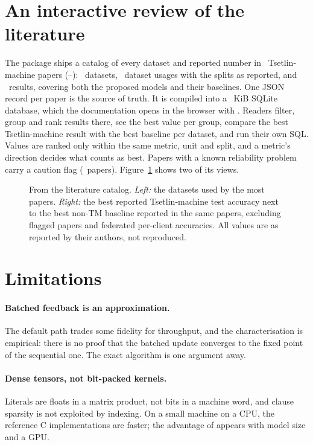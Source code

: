 \documentclass[10.5pt,a4paper]{article}
\begin{document}
\section{An interactive review of the literature}

The package ships a catalog of every dataset and reported number in \litNpapers\
Tsetlin-machine papers (\litYearMin--\litYearMax): \litNdatasets\ datasets, \litNusages\
dataset usages with the splits as reported, and \litNresults\ results, covering both the
proposed models and their baselines. One JSON record per paper is the source of truth. It is
compiled into a \litDbKiB~KiB SQLite database, which the documentation opens in the browser
with \code{sql.js}. Readers filter, group and rank results there, see the best value per
group, compare the best Tsetlin-machine result with the best baseline per dataset, and run
their own SQL. Values are ranked only within the same metric, unit and split, and a metric's
direction decides what counts as best. Papers with a known reliability problem carry a
caution flag (\litNflagged\ papers). Figure~\ref{fig:s-literature} shows two of its views.

\begin{figure}[htbp]
\centering
\resizebox{\linewidth}{!}{}
\caption{From the literature catalog. \emph{Left:} the datasets used by the most papers.
  \emph{Right:} the best reported Tsetlin-machine test accuracy next to the best non-TM
  baseline reported in the same papers, excluding flagged papers and federated per-client
  accuracies. All values are as reported by their authors, not reproduced.}
\label{fig:s-literature}
\end{figure}

\section{Limitations}

\paragraph{Batched feedback is an approximation.} The default path trades some fidelity for
throughput, and the characterisation is empirical: there is no proof that the batched update
converges to the fixed point of the sequential one. The exact algorithm is one argument away.

\paragraph{Dense tensors, not bit-packed kernels.} Literals are floats in a matrix product, not
bits in a machine word, and clause sparsity is not exploited by indexing. On a small machine
on a CPU, the reference C implementations are faster; the advantage of \ttlibname appears with
model size and a GPU.
\end{document}
